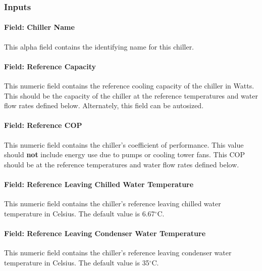 \subsubsection{Inputs}\label{inputs-5-021}

\paragraph{Field: Chiller Name}\label{field-chiller-name-000}

This alpha field contains the identifying name for this chiller.

\paragraph{Field: Reference Capacity}\label{field-reference-capacity-1}

This numeric field contains the reference cooling capacity of the chiller in Watts. This should be the capacity of the chiller at the reference temperatures and water flow rates defined below. Alternately, this field can be autosized.

\paragraph{Field: Reference COP}\label{field-reference-cop-1}

This numeric field contains the chiller's coefficient of performance. This value should \textbf{not} include energy use due to pumps or cooling tower fans. This COP should be at the reference temperatures and water flow rates defined below.

\paragraph{Field: Reference Leaving Chilled Water Temperature}\label{field-reference-leaving-chilled-water-temperature-1}

This numeric field contains the chiller's reference leaving chilled water temperature in Celsius. The default value is 6.67$^\circ$C.

\paragraph{Field: Reference Leaving Condenser Water Temperature}\label{field-reference-leaving-condenser-water-temperature}

This numeric field contains the chiller's reference leaving condenser water temperature in Celsius. The default value is 35$^\circ$C.

